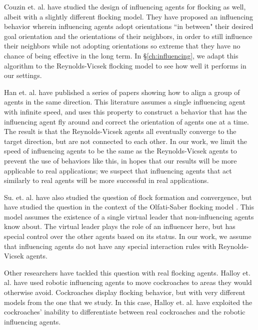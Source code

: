 Couzin et. al. \cite{couzin2005} have studied the design of influencing agents
for flocking as well, albeit with a slightly different flocking model.
They have proposed an influencing behavior wherein influencing agents adopt
orientations ``in between" their desired goal orientation and the orientations
of their neighbors, in order to still influence their neighbors while not
adopting orientations so extreme that they have no chance of being effective in
the long term.
In \S\ref{ch:influencing}, we adapt this algorithm to the Reynolds-Vicsek
flocking model to see how well it performs in our settings.

Han et. al. \cite{han2010teleporting} have published a series of papers showing
how to align a group of agents in the same direction.
This literature assumes a single influencing agent with infinite speed, and
uses this property to construct a behavior that has the influencing agent
fly around and correct the orientation of agents one at a time.
The result is that the Reynolds-Vicsek agents all eventually converge to the
target direction, but are not connected to each other.
In our work, we limit the speed of influencing agents to be the same as the
Reynolds-Vicsek agents to prevent the use of behaviors like this, in hopes
that our results will be more applicable to real applications; we suspect that
influencing agents that act similarly to real agents will be more successful
in real applications.

Su. et. al. \cite{su2009virtualleaderinformed} have also studied the question
of flock formation and convergence, but have studied the question in the
context of the Olfati-Saber flocking model
\cite{olfati2006virtualleaderinformed}.
This model assumes the existence of a single virtual leader that
non-influencing agents know about.
The virtual leader plays the role of an influencer here, but has special
control over the other agents based on its status.
In our work, we assume that influencing agents do not have any special
interaction rules with Reynolds-Vicsek agents.

Other researchers have tackled this question with real flocking agents.
Halloy et. al. \cite{Halloy2007} have used robotic influencing agents to move
cockroaches to areas they would otherwise avoid.
Cockroaches display flocking behavior, but with very different models from the
one that we study.
In this case, Halloy et. al. have exploited the cockroaches' inability to
differentiate between real cockroaches and the robotic influencing agents.

